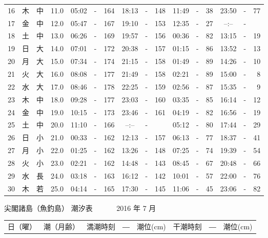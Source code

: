 \documentclass[12pt.a4j]{jsarticle}
\begin{document}
\begin{center}
\begin{table}[ht]
\begin{tabular}{|rc|cr|ccrccr|ccrccr|}
16 & 木 & 中 & 11.0 &  05:02 &-& 164  &  18:13 &-& 148  &   11:49 &-&  38  &   23:50 &-&  77  \\
17 & 金 & 中 & 12.0 &  05:47 &-& 167  &  19:10 &-& 153  &   12:35 &-&  27  &   --:-- &-&     \\
18 & 土 & 中 & 13.0 &  06:26 &-& 169  &  19:57 &-& 156  &   00:36 &-&  82  &   13:15 &-&  19  \\
19 & 日 & 大 & 14.0 &  07:01 &-& 172  &  20:38 &-& 157  &   01:15 &-&  86  &   13:52 &-&  13  \\
20 & 月 & 大 & 15.0 &  07:34 &-& 174  &  21:15 &-& 158  &   01:49 &-&  89  &   14:26 &-&  10  \\
21 & 火 & 大 & 16.0 &  08:08 &-& 177  &  21:49 &-& 158  &   02:21 &-&  89  &   15:00 &-&   8  \\
22 & 水 & 大 & 17.0 &  08:46 &-& 178  &  22:25 &-& 159  &   02:56 &-&  87  &   15:35 &-&   9  \\
23 & 木 & 中 & 18.0 &  09:28 &-& 177  &  23:03 &-& 160  &   03:35 &-&  85  &   16:14 &-&  12  \\
24 & 金 & 中 & 19.0 &  10:15 &-& 173  &  23:46 &-& 161  &   04:19 &-&  82  &   16:56 &-&  19  \\
25 & 土 & 中 & 20.0 &  11:10 &-& 166  &  --:-- &-&     &   05:12 &-&  80  &   17:44 &-&  29  \\
26 & 日 & 小 & 21.0 &  00:33 &-& 162  &  12:13 &-& 157  &   06:13 &-&  77  &   18:37 &-&  41  \\
27 & 月 & 小 & 22.0 &  01:25 &-& 162  &  13:26 &-& 148  &   07:25 &-&  74  &   19:39 &-&  54  \\
28 & 火 & 小 & 23.0 &  02:21 &-& 162  &  14:48 &-& 143  &   08:45 &-&  67  &   20:48 &-&  66  \\
29 & 水 & 長 & 24.0 &  03:18 &-& 163  &  16:12 &-& 142  &   10:01 &-&  57  &   22:00 &-&  76  \\
30 & 木 & 若 & 25.0 &  04:14 &-& 165  &  17:30 &-& 145  &   11:06 &-&  45  &   23:06 &-&  82  \\
   \hline
   \end{tabular}
\end{table}
\newpage
 {\LARGE 尖閣諸島（魚釣島）  潮汐表　　　}
 {\large 2016 年  7 月}\\
 \begin{table}[ht]
    \begin{tabular}{|rc|cr|ccrccr|ccrccr|}
    \hline
    \multicolumn{2}{|c|}{日（曜）} & \multicolumn{2}{c|}{潮（月齢）} & \multicolumn{6}{c|}{満潮時刻　―　潮位(cm)} & \multicolumn{6}{c|}{干潮時刻　―　潮位(cm)} \\

\end{tabular}
\end{table}
\end{center}
\end{document}
